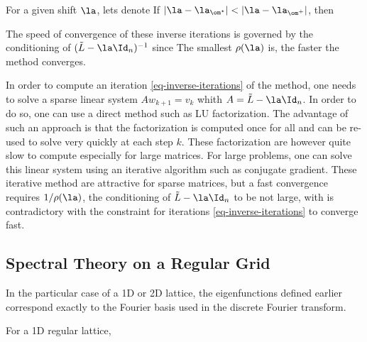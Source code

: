 \begin{thm}
	For a given shift $\la$, lets denote
	\eq{ \om^\star = \uargmin{\om} |\la-\la_\om| \qqandqq \om^+ = \uargmin{\om \neq \om^\star} |\la-\la_\om|  }
	If $|\la-\la_{\om^\star}| < |\la-\la_{\om^+}|$, then
\end{thm}

The speed of convergence of these inverse iterations is governed by the conditioning of $(\tilde L-\la \Id_n)^{-1}$ since
The smallest $\rho(\la)$ is, the faster the method converges. 

In order to compute an iteration \eqref{eq-inverse-iterations} of the method, one needs to solve a sparse linear system $A w_{k+1} = v_k$ whith $A = \tilde L - \la \Id_n$. In order to do so, one can use a direct method such as LU factorization. The advantage of such an approach is that the factorization is computed once for all and can be re-used to solve very quickly at each step $k$. These factorization are however quite slow to compute especially for large matrices. For large problems, one can solve this linear system using an iterative algorithm such as conjugate gradient. These iterative method are attractive for sparse matrices, but a fast convergence requires $1/\rho(\la)$, the conditioning of $\tilde L-\la \Id_n$ to be not large, with is contradictory with the constraint for iterations \ref{eq-inverse-iterations} to converge fast.

\subsection{Spectral Theory on a Regular Grid}

In the particular case of a 1D or 2D lattice, the eigenfunctions defined earlier correspond exactly to the Fourier basis used in the discrete Fourier transform.

\begin{thm}[Spectrum in 1D] For a 1D regular lattice,
\end{thm}

